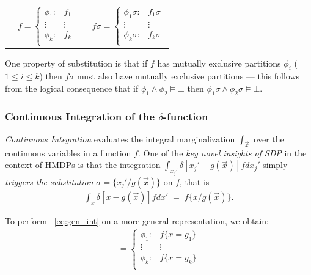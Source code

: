\documentclass[twoside,11pt]{article}
\begin{document}
{%
\begin{center}
\begin{tabular}{r c c l}
&
\hspace{-6mm} 
  $f = \begin{cases}
    \phi_1: & f_1 \\ 
   \vdots&\vdots\\ 
    \phi_k: & f_k \\ 
  \end{cases}$
&

&
\hspace{-2mm}
  $f\sigma = \begin{cases}
    \phi_1\sigma: & f_1\sigma \\ 
   \vdots&\vdots\\ 
    \phi_k\sigma: & f_k\sigma \\ 
  \end{cases}$
\end{tabular}
\end{center}
}
\normalsize

One property of substitution is that
if $f$ has mutually exclusive partitions $\phi_i$ ($1 \leq i \leq k$)
then $f\sigma$ must also have mutually exclusive partitions ---
this follows from the logical consequence that 
if $\phi_1 \land \phi_2 \models \bot$
then $\phi_1\sigma \land \phi_2\sigma \models \bot$.

\subsubsection*{Continuous Integration of the $\delta$-function}
\emph{Continuous Integration} evaluates the integral
marginalization $\int_{\vec{x}}$ over the continuous variables
in a function $f$. One of the \emph{key novel insights of SDP} in the context of
HMDPs is that the integration 
$\int_{x_j'} \delta[x_j' - g(\vec{x})] f dx_j'$ 
simply \emph{triggers the substitution} $\sigma = \{ x_j' / g(\vec{x}) \}$
on $f$, that is
\begin{align}
\int_{x} \delta[x - g(\vec{x})] f dx' \; = \; f \{x / g(\vec{x}) \} . \label{eq:gen_int}
\end{align}

To perform ~\ref{eq:gen_int} on a more general
representation, we obtain: 
\begin{align*}
    = \begin{cases}
    \phi_1: & f \{ x = g_1 \} \\ 
   \vdots&\vdots\\ 
    \phi_k: & f \{ x= g_k \}  \\ 
  \end{cases}
\end{align*}
\end{document}
